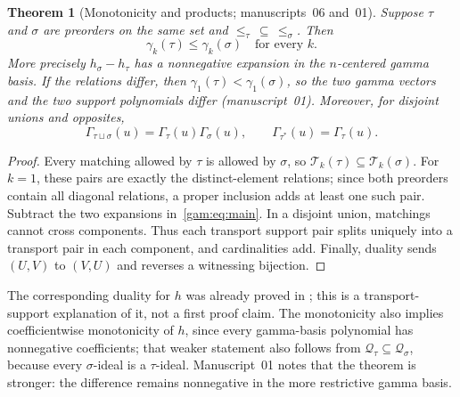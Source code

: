 \documentclass[11pt]{article}
\numberwithin{equation}{section}
\newtheorem{theorem}{Theorem}[section]
\theoremstyle{definition}
\newcommand{\Qt}{\mathcal Q_\tau}
\newcommand{\Tset}{\mathcal T}
\begin{document}
\begin{theorem}[Monotonicity and products; manuscripts~06 and~01]\label{gam:thm:monotone}
Suppose $\tau$ and $\sigma$ are preorders on the same set and
$\le_\tau\,\subseteq\,\le_\sigma$. Then
\begin{equation}
 \gamma_k(\tau)\le\gamma_k(\sigma)\quad\text{for every }k.
 \label{gam:eq:monotonicity}
\end{equation}
More precisely $h_\sigma-h_\tau$ has a nonnegative expansion in the
$n$-centered gamma basis. If the relations differ, then
$\gamma_1(\tau)<\gamma_1(\sigma)$, so the two gamma vectors and the two
support polynomials differ (manuscript~01). Moreover, for disjoint unions
and opposites,
\begin{equation}
 \Gamma_{\tau\sqcup\sigma}(u)=\Gamma_\tau(u)\Gamma_\sigma(u),
 \qquad \Gamma_{\tau^*}(u)=\Gamma_\tau(u).
 \label{gam:eq:productdual}
\end{equation}
\end{theorem}
\begin{proof}
Every matching allowed by $\tau$ is allowed by $\sigma$, so
$\Tset_k(\tau)\subseteq\Tset_k(\sigma)$. For $k=1$, these pairs are exactly
the distinct-element relations; since both preorders contain all diagonal
relations, a proper inclusion adds at least one such pair. Subtract the two
expansions in~\eqref{gam:eq:main}. In a disjoint union, matchings cannot
cross components. Thus each transport support pair splits uniquely into a
transport pair in each component, and cardinalities add. Finally, duality
sends $(U,V)$ to $(V,U)$ and reverses a witnessing bijection.
\end{proof}
The corresponding duality for $h$ was already proved in \cite{DHLTW}; this
is a transport-support explanation of it, not a first proof claim. The
monotonicity also implies coefficientwise monotonicity of $h$, since every
gamma-basis polynomial has nonnegative coefficients; that weaker statement
also follows from $\Qt\subseteq\mathcal Q_\sigma$, because every
$\sigma$-ideal is a $\tau$-ideal. Manuscript~01 notes that the theorem is
stronger: the difference remains nonnegative in the more restrictive gamma
basis.
\end{document}
